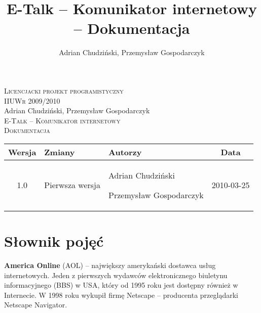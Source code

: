\documentclass[a4paper,12pt]{article}
\author{Adrian Chudziński, Przemysław Gospodarczyk}
\title{E-Talk -- Komunikator internetowy -- Dokumentacja}
\begin{document}
\makeatletter
    \renewcommand\@seccntformat[1]{\csname the#1\endcsname.\quad}
    \renewcommand\numberline[1]{#1.\hskip0.7em}
\makeatother

\begin{titlepage}
\begin{center}

    \textsc{Licencjacki projekt programistyczny}\\[0.1cm]
    \textsc{IIUWr 2009/2010}\\[6cm]
    Adrian Chudziński, Przemysław Gospodarczyk\\[1cm]
    \textsc{\Large E-Talk -- Komunikator internetowy}\\[0.25cm]
    \textsc{\large Dokumentacja}\\[8.675cm]

    {\footnotesize
    \begin{tabular}{| c | p{4cm} | p{4.25cm} | c | }
        \hline
        Wersja  &
        Zmiany  &
        Autorzy &
        Data    \\
        \hline
        1.0                                                                   &
        Pierwsza wersja                                                       &
        \par Adrian Chudziński \par Przemysław Gospodarczyk                                                  &
        2010-03-25                                                            \\
        \hline
    \end{tabular}
    }

\end{center}
\end{titlepage}

\break

\setcounter{page}{2}

\tableofcontents

\break
\section[Słownik pojęć]{Słownik pojęć}
\noindent\textbf{America Online} (AOL) -- największy amerykański dostawca usług internetowych. Jeden z pierwszych wydawców elektronicznego biuletynu informacyjnego (BBS) w USA, który od 1995 roku jest dostępny również w Internecie. W 1998 roku wykupił firmę Netscape -- producenta przeglądarki Netscape Navigator.\\
\end{document}
